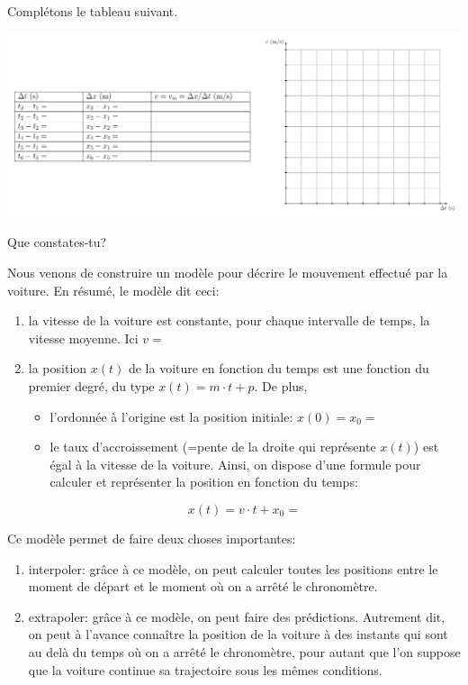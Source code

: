 \documentclass[
  letterpaper,
  DIV=11,
  numbers=noendperiod]{scrartcl}
\providecommand{\tightlist}{%
  \setlength{\itemsep}{0pt}\setlength{\parskip}{0pt}}\usepackage{longtable,booktabs,array}
\theoremstyle{definition}
\theoremstyle{definition}
\theoremstyle{remark}
\begin{document}
Complétons le tableau suivant.

\includegraphics[width=1\textwidth,height=\textheight]{figures/mru/fig3.pdf}

Que constates-tu?

\vspace{3cm}

Nous venons de construire un modèle pour décrire le mouvement effectué
par la voiture. En résumé, le modèle dit ceci:

\begin{enumerate}
\def\labelenumi{\arabic{enumi}.}
\tightlist
\item
  la vitesse de la voiture est constante, pour chaque intervalle de
  temps, la vitesse moyenne. Ici \(v=\)
\item
  la position \(x(t)\) de la voiture en fonction du temps est une
  fonction du premier degré, du type \(x(t)=m\cdot t+p\). De plus,

  \begin{itemize}
  \tightlist
  \item
    l'ordonnée à l'origine est la position initiale: \(x(0)=x_0=\)
  \item
    le taux d'accroissement (=pente de la droite qui représente
    \(x(t)\)) est égal à la vitesse de la voiture. Ainsi, on dispose
    d'une formule pour calculer et représenter la position en fonction
    du temps:
  \end{itemize}

  \[
  x(t)=v\cdot t+x_0=
  \]
\end{enumerate}

Ce modèle permet de faire deux choses importantes:

\begin{enumerate}
\def\labelenumi{\arabic{enumi}.}
\tightlist
\item
  interpoler: grâce à ce modèle, on peut calculer toutes les positions
  entre le moment de départ et le moment où on a arrêté le chronomètre.
\item
  extrapoler: grâce à ce modèle, on peut faire des prédictions.
  Autrement dit, on peut à l'avance connaître la position de la voiture
  à des instants qui sont au delà du temps où on a arrêté le
  chronomètre, pour autant que l'on suppose que la voiture continue sa
  trajectoire sous les mêmes conditions.
\end{enumerate}
\end{document}
